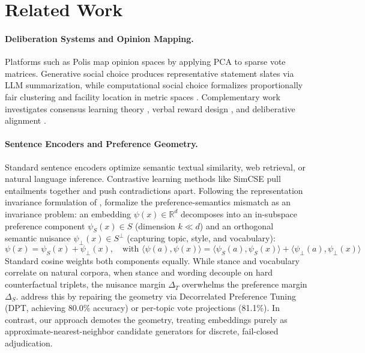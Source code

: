 \documentclass[11pt,a4paper]{article}
\begin{document}
\section{Related Work}

\paragraph{Deliberation Systems and Opinion Mapping.} Platforms such as Polis \citep{small2021polis} map opinion spaces by applying PCA to sparse vote matrices. Generative social choice \citep{fish2026generative,boehmer2025generative} produces representative statement slates via LLM summarization, while computational social choice formalizes proportionally fair clustering \citep{chen2019proportionally,kellerhals2024proportional} and facility location in metric spaces \citep{feldman2016voting}. Complementary work investigates consensus learning theory \citep{blair2026consensus}, verbal reward design \citep{blair2025reflective}, and deliberative alignment \citep{tessler2024ai}.

\paragraph{Sentence Encoders and Preference Geometry.} Standard sentence encoders \citep{reimers2019sentence,muennighoff2023mteb} optimize semantic textual similarity, web retrieval, or natural language inference. Contrastive learning methods like SimCSE \citep{gao2021simcse} pull entailments together and push contradictions apart. Following the representation invariance formulation of \citet{achille2018emergence}, \citet{blair2026embeddings} formalize the preference-semantics mismatch as an invariance problem: an embedding $\psi(x) \in \mathbb{R}^d$ decomposes into an in-subspace preference component $\psi_S(x) \in S$ (dimension $k \ll d$) and an orthogonal semantic nuisance $\psi_\perp(x) \in S^\perp$ (capturing topic, style, and vocabulary):
\begin{equation}
\psi(x) = \psi_S(x) + \psi_\perp(x), \quad \text{with } \langle \psi(a), \psi(x) \rangle = \langle \psi_S(a), \psi_S(x) \rangle + \langle \psi_\perp(a), \psi_\perp(x) \rangle
\end{equation}
Standard cosine weights both components equally. While stance and vocabulary correlate on natural corpora, when stance and wording decouple on hard counterfactual triplets, the nuisance margin $\Delta_T$ overwhelms the preference margin $\Delta_S$. \citet{blair2026embeddings} address this by repairing the geometry via Decorrelated Preference Tuning (DPT, achieving 80.0\% accuracy) or per-topic vote projections (81.1\%). In contrast, our approach demotes the geometry, treating embeddings purely as approximate-nearest-neighbor candidate generators for discrete, fail-closed adjudication.
\end{document}
